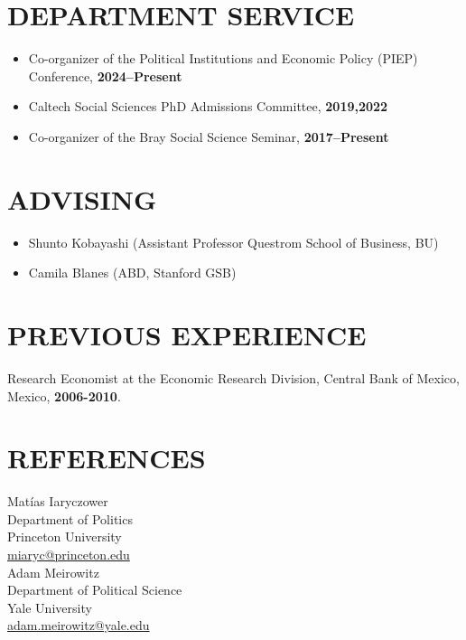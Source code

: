 \documentclass[margin, 10pt]{res} %
\begin{document}
\begin{resume}
\section{DEPARTMENT SERVICE}
\begin{itemize} \itemsep -2pt
\item[-] Co-organizer of the Political Institutions and Economic
  Policy (PIEP) Conference, \textbf{2024–Present}
 \item[-] Caltech Social Sciences PhD Admissions Committee, \textbf{2019,2022}
\item[-] Co-organizer of the Bray Social Science Seminar, \textbf{2017–Present}
\end{itemize}

\section{ADVISING}
\begin{itemize} \itemsep -2pt
 \item[-] Shunto Kobayashi (Assistant Professor Questrom School of Business, BU)
 \item[-] Camila Blanes (ABD, Stanford GSB)
 \end{itemize}
\section{PREVIOUS EXPERIENCE}

Research Economist at the Economic Research Division, Central Bank of
Mexico, Mexico,  \textbf{2006-2010}.

\section{REFERENCES}

\noindent Mat\'{i}as Iaryczower\\
\noindent Department of Politics\\
\noindent Princeton University\\
\noindent \href{mailto:miaryc@princeton.edu}{miaryc@princeton.edu}\\

\noindent Adam Meirowitz\\
\noindent Department of Political Science\\
\noindent Yale University\\
\noindent \href{mailto:adam.meirowitz@yale.edu}{adam.meirowitz@yale.edu}\\


\end{resume}
\end{document}
